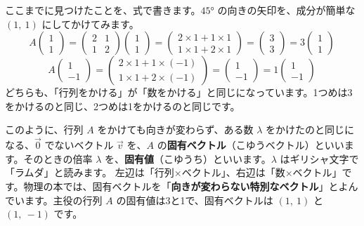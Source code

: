 \label{bk:7-8:namae}ここまでに見つけたことを、式で書きます。$45°$ の向きの矢印を、成分が簡単な $(1,\ 1)$ にしてかけてみます。
\[ A\begin{pmatrix}1\\1\end{pmatrix}=\begin{pmatrix}2&1\\1&2\end{pmatrix}\begin{pmatrix}1\\1\end{pmatrix}=\begin{pmatrix}2\times1+1\times1\\1\times1+2\times1\end{pmatrix}=\begin{pmatrix}3\\3\end{pmatrix}=3\begin{pmatrix}1\\1\end{pmatrix} \]
\[ A\begin{pmatrix}1\\-1\end{pmatrix}=\begin{pmatrix}2\times1+1\times(-1)\\1\times1+2\times(-1)\end{pmatrix}=\begin{pmatrix}1\\-1\end{pmatrix}=1\begin{pmatrix}1\\-1\end{pmatrix} \]
どちらも、「行列をかける」が「数をかける」と同じになっています。1つめは3をかけるのと同じ、2つめは1をかけるのと同じです。

このように、行列 $A$ をかけても向きが変わらず、ある数 $\lambda$ をかけたのと同じになる、$\vec 0$ でないベクトル $\vec v$ を、$A$ の\textbf{固有ベクトル}（こゆうベクトル）といいます。そのときの倍率 $\lambda$ を、\textbf{固有値}（こゆうち）といいます。$\lambda$ はギリシャ文字で「ラムダ」と読みます。
左辺は「行列×ベクトル」、右辺は「数×ベクトル」です。物理の本では、固有ベクトルを「\textbf{向きが変わらない特別なベクトル}」とよんでいます。主役の行列 $A$ の固有値は3と1で、固有ベクトルは $(1,\ 1)$ と $(1,\ -1)$ です。

